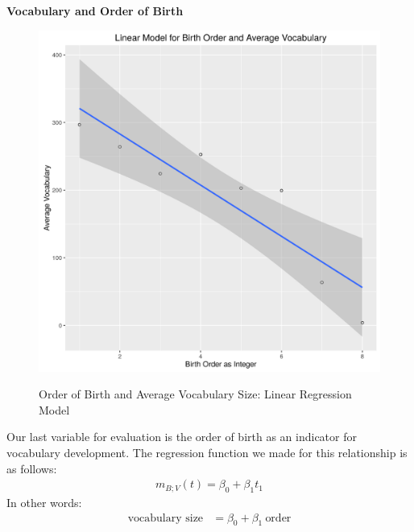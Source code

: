 \documentclass[11pt]{article}  %
\begin{document}
\textbf{Vocabulary and Order of Birth}
\begin{figure}[h]
\centering
\caption{Order of Birth and Average Vocabulary Size: Linear Regression Model}
\includegraphics[scale=.50]{means_orders}
\label{birthFig}
\end{figure}

\indent Our last variable for evaluation is the order of birth as an indicator for vocabulary development. The regression function we made for this relationship is as follows:
    \begin{align*}
        m_{B;V}(t) = \beta_0 + \beta_1 t_1
    \end{align*}
    In other words:
    \begin{align*}
        \text{vocabulary size} &= \beta_0 + \beta_1\ \text{order}
    \end{align*}
\end{document}
